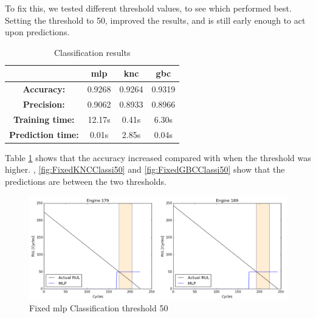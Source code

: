 \documentclass[english, a4paper]{report}
\begin{document}
{{{            To fix this, we tested different threshold values, to see which performed best. Setting the threshold to 50, improved the results, and is still early enough to act upon predictions.   
            
            \begin{table}[H]
                \centering
                \begin{tabular}{|c|c|c|c|}
                    \hline
                    \textbf{} & \textbf{\gls{mlp}} & \textbf{\gls{knc}} & \textbf{\gls{gbc}} \\ \hline
                    \textbf{Accuracy:} & 0.9268 & 0.9264 & 0.9319 \\ \hline
                    \textbf{Precision:} & 0.9062 & 0.8933 & 0.8966 \\ \hline
                    \textbf{Training time:} & 12.17s & 0.41s & 6.30s \\ \hline
                    \textbf{Prediction time:} & 0.01s & 2.85s & 0.04s \\ \hline
                \end{tabular}
                \caption{Classification results}
                \label{classiRes}
            \end{table}
            
            Table \ref{classiRes} shows that the accuracy increased compared with when the threshold was higher. , \ref{fig:FixedKNCClassi50} and \ref{fig:FixedGBCClassi50} show that the predictions are between the two thresholds.
            
            \begin{figure}[H]
                \centering
                \includegraphics[width=\textwidth]{Fixed_MLPClassi_50}
                \caption{Fixed \gls{mlp} Classification threshold 50}
                \label{fig:FixedMLPClassi50}
            \end{figure}
            
}}}
\end{document}
